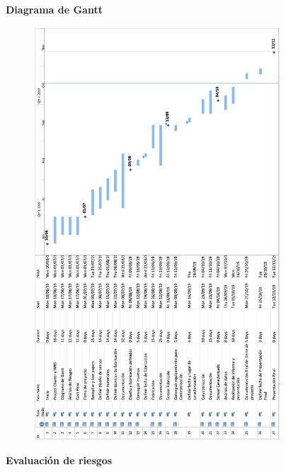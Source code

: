 \newpage 
\begin{flushleft}
{\Large \textbf{Diagrama de Gantt}}
\end{flushleft}
\begin{figure}[H]
  \centering
    \includegraphics[width=0.82\textwidth]{Figuras/Gantt}
  \label{fig:Gantt}
\end{figure}
\newpage 
\begin{flushleft}
{\Large \textbf{Evaluación de riesgos}}
\end{flushleft}

